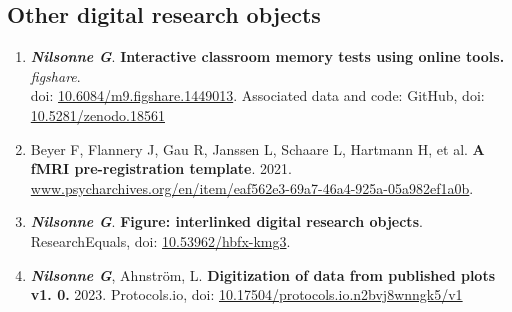\documentclass[10pt]{article}
\begin{document}
\subsection*{Other digital research objects}
\begin{enumerate}[nolistsep]
\item \textbf{\textit{Nilsonne G}}. \textbf{Interactive classroom memory tests using online tools.} \emph{figshare}.\\
doi: \href{dx.doi.org/10.6084/m9.figshare.1449013}{10.6084/m9.figshare.1449013}.
Associated data and code: GitHub, doi: \href{http://dx.doi.org/10.5281/zenodo.18561}{10.5281/zenodo.18561}
\item Beyer F, Flannery J, Gau R, Janssen L, Schaare L, Hartmann H, et al. \textbf{A fMRI pre-registration template}. 2021.
\href{https://www.psycharchives.org/en/item/eaf562e3-69a7-46a4-925a-05a982ef1a0b}{www.psycharchives.org/en/item/eaf562e3-69a7-46a4-925a-05a982ef1a0b}.
\item \textbf{\textit{Nilsonne G}}. \textbf{Figure: interlinked digital research objects}. ResearchEquals, doi:
\href{https://doi.org/10.53962/hbfx-kmg3}{10.53962/hbfx-kmg3}.
\item \textbf{\textit{Nilsonne G}}, Ahnström, L. \textbf{Digitization of data from published plots v1. 0.} 2023. Protocols.io, doi: \href{https://dx.doi.org/10.17504/protocols.io.n2bvj8wnngk5/v1}{10.17504/protocols.io.n2bvj8wnngk5/v1}
\end{enumerate}
\end{document}
